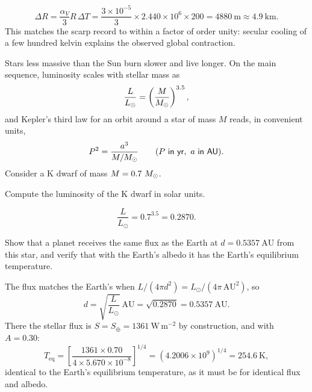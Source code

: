 \begin{solution}
\[
  \Delta R = \frac{\alpha_V}{3} R\, \Delta T = \frac{3 \times 10^{-5}}{3} \times 2.440 \times 10^{6} \times 200 = 4880\ \mathrm{m} \approx 4.9\ \mathrm{km}.
\]
This matches the scarp record to within a factor of order unity: secular cooling of a few hundred kelvin explains the observed global contraction.
\end{solution}



Stars less massive than the Sun burn slower and live longer.
On the main sequence, luminosity scales with stellar mass as
\[
  \frac{L}{L_\odot} = \left( \frac{M}{M_{\odot}} \right)^{3.5},
\]
and Kepler's third law for an orbit around a star of mass $M$ reads, in convenient units,
\[
  P^2 = \frac{a^3}{M/\Msun} \qquad (P\ \mathrm{in\ yr},\ a\ \mathrm{in\ AU}).
\]
Consider a K dwarf of mass $M = 0.7\ M_{\odot}$.

\parti {} Compute the luminosity of the K dwarf in solar units.

\begin{solution}
\[
  \frac{L}{L_\odot} = 0.7^{3.5} = 0.2870.
\]
\end{solution}

\parti {} Show that a planet receives the same flux as the Earth at $d = 0.5357\ \mathrm{AU}$ from this star, and verify that with the Earth's albedo it has the Earth's equilibrium temperature.

\begin{solution}
The flux matches the Earth's when $L/(4\pi d^2) = L_\odot/(4\pi\, \mathrm{AU}^2)$, so
\[
  d = \sqrt{\frac{L}{L_\odot}}\ \mathrm{AU} = \sqrt{0.2870} = 0.5357\ \mathrm{AU}.
\]
There the stellar flux is $S = S_\oplus = 1361\ \mathrm{W\,m^{-2}}$ by construction, and with $A = 0.30$:
\[
  T_{\mathrm{eq}} = \left[ \frac{1361 \times 0.70}{4 \times 5.670 \times 10^{-8}} \right]^{1/4}
                  = \left( 4.2006 \times 10^{9} \right)^{1/4} = 254.6\ \mathrm{K},
\]
identical to the Earth's equilibrium temperature, as it must be for identical flux and albedo.
\end{solution}

